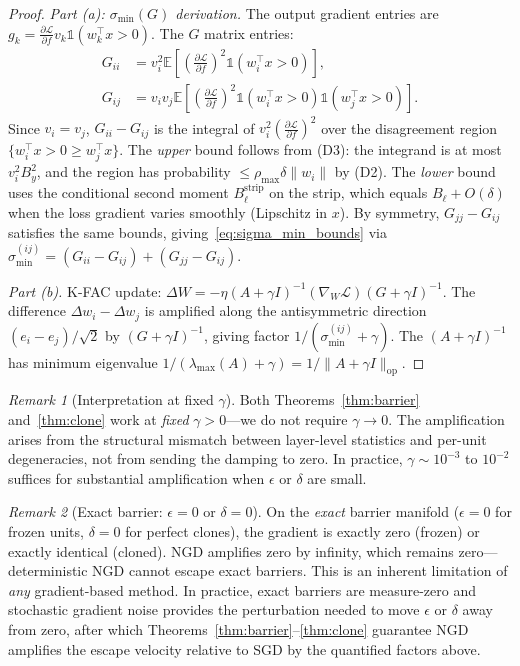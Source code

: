\documentclass{article}
\providecommand{\E}{\mathbb{E}}
\providecommand{\norm}[1]{\lVert #1 \rVert}
\theoremstyle{plain}
\theoremstyle{definition}
\theoremstyle{remark}
\newtheorem{remark}{Remark}
\begin{document}
\begin{proof}
\emph{Part (a): $\sigma_{\min}(G)$ derivation.}
The output gradient entries are $g_k = \frac{\partial\mathcal{L}}{\partial f} v_k \mathbb{1}(w_k^\top x > 0)$. The $G$ matrix entries:
\begin{align}
    G_{ii} &= v_i^2 \E\!\left[\!\left(\tfrac{\partial\mathcal{L}}{\partial f}\right)^{\!2} \mathbb{1}(w_i^\top x > 0)\right]\!, \\
    G_{ij} &= v_i v_j \E\!\left[\!\left(\tfrac{\partial\mathcal{L}}{\partial f}\right)^{\!2} \mathbb{1}(w_i^\top x > 0)\mathbb{1}(w_j^\top x > 0)\right]\!.
\end{align}
Since $v_i = v_j$, $G_{ii} - G_{ij}$ is the integral of $v_i^2(\frac{\partial\mathcal{L}}{\partial f})^2$ over the disagreement region $\{w_i^\top x > 0 \geq w_j^\top x\}$. The \emph{upper} bound follows from (D3): the integrand is at most $v_i^2 B_y^2$, and the region has probability $\leq \rho_{\max}\delta\norm{w_i}$ by (D2). The \emph{lower} bound uses the conditional second moment $B_\ell^{\mathrm{strip}}$ on the strip, which equals $B_\ell + O(\delta)$ when the loss gradient varies smoothly (Lipschitz in $x$). By symmetry, $G_{jj} - G_{ij}$ satisfies the same bounds, giving~\eqref{eq:sigma_min_bounds} via $\sigma_{\min}^{(ij)} = (G_{ii} - G_{ij}) + (G_{jj} - G_{ij})$.

\emph{Part (b).}
K-FAC update: $\Delta W = -\eta(A + \gamma I)^{-1}(\nabla_W\mathcal{L})(G + \gamma I)^{-1}$. The difference $\Delta w_i - \Delta w_j$ is amplified along the antisymmetric direction $(e_i - e_j)/\sqrt{2}$ by $(G + \gamma I)^{-1}$, giving factor $1/(\sigma_{\min}^{(ij)} + \gamma)$. The $(A+\gamma I)^{-1}$ has minimum eigenvalue $1/(\lambda_{\max}(A)+\gamma) = 1/\norm{A+\gamma I}_{\mathrm{op}}$.
\end{proof}

\begin{remark}[Interpretation at fixed $\gamma$]
\label{rem:fixed_gamma}
Both Theorems~\ref{thm:barrier} and~\ref{thm:clone} work at \emph{fixed} $\gamma > 0$---we do not require $\gamma \to 0$. The amplification arises from the structural mismatch between layer-level statistics and per-unit degeneracies, not from sending the damping to zero. In practice, $\gamma \sim 10^{-3}$ to $10^{-2}$ suffices for substantial amplification when $\epsilon$ or $\delta$ are small.
\end{remark}

\begin{remark}[Exact barrier: $\epsilon = 0$ or $\delta = 0$]
\label{rem:exact_barrier}
On the \emph{exact} barrier manifold ($\epsilon = 0$ for frozen units, $\delta = 0$ for perfect clones), the gradient is exactly zero (frozen) or exactly identical (cloned). NGD amplifies zero by infinity, which remains zero---deterministic NGD cannot escape exact barriers. This is an inherent limitation of \emph{any} gradient-based method. In practice, exact barriers are measure-zero and stochastic gradient noise provides the perturbation needed to move $\epsilon$ or $\delta$ away from zero, after which Theorems~\ref{thm:barrier}--\ref{thm:clone} guarantee NGD amplifies the escape velocity relative to SGD by the quantified factors above.
\end{remark}
\end{document}
